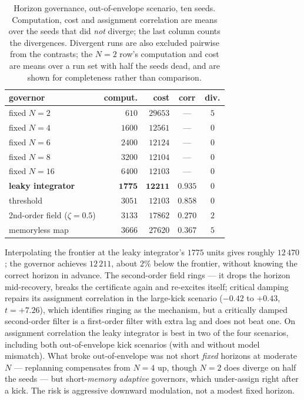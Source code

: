 \documentclass[journal]{IEEEtran}
\theoremstyle{definition}
\begin{document}
\begin{table}[t]
\caption{Horizon governance, out-of-envelope scenario, ten seeds. Computation, cost
and assignment correlation are means over the seeds that did \emph{not}
diverge; the last column counts the divergences. Divergent runs are also
excluded pairwise from the contrasts; the $N=2$
row's computation and cost are means over a run set with half the seeds dead,
and are shown for completeness rather than comparison.}
\label{tab:alphaN}
\centering
\small
\setlength{\tabcolsep}{4pt}
\begin{tabular}{@{}lrrcc@{}}
\toprule
governor & comput. & cost & corr & div.\\
\midrule
fixed $N=2$                    & $610$  & $29653$ & --- & $5$\\
fixed $N=4$                    & $1600$ & $12561$ & --- & $0$\\
fixed $N=6$                    & $2400$ & $12124$ & --- & $0$\\
fixed $N=8$                    & $3200$ & $12104$ & --- & $0$\\
fixed $N=16$                   & $6400$ & $12103$ & --- & $0$\\
\midrule
\textbf{leaky integrator}      & $\mathbf{1775}$ & $\mathbf{12211}$ & $0.935$ & $0$\\
threshold                      & $3051$ & $12103$ & $0.858$ & $0$\\
2nd-order field ($\zeta{=}0.5$)& $3133$ & $17862$ & $0.270$ & $2$\\
memoryless map                 & $3666$ & $27620$ & $0.367$ & $5$\\
\bottomrule
\end{tabular}
\end{table}

Interpolating the frontier at the leaky integrator's $1775$ units gives
roughly $12\,470$; the governor achieves $12\,211$, about $2\%$ below the
frontier, without knowing the correct horizon in advance. The second-order
field rings --- it drops the horizon mid-recovery, breaks the certificate
again and re-excites itself; critical damping repairs its assignment
correlation in the large-kick scenario ($-0.42$ to $+0.43$, $t=+7.26$), which
identifies ringing as the mechanism, but a critically damped second-order
filter is a first-order filter with extra lag and does not beat one. On
assignment correlation the leaky integrator is best in two of the four
scenarios, including both out-of-envelope kick scenarios (with and without
model mismatch). What broke
out-of-envelope was not short \emph{fixed} horizons at moderate $N$ ---
replanning compensates from $N=4$ up, though $N=2$ does diverge on half the
seeds --- but short-\emph{memory adaptive} governors, which under-assign right
after a kick. The risk is aggressive downward modulation, not a modest fixed
horizon.
\end{document}
